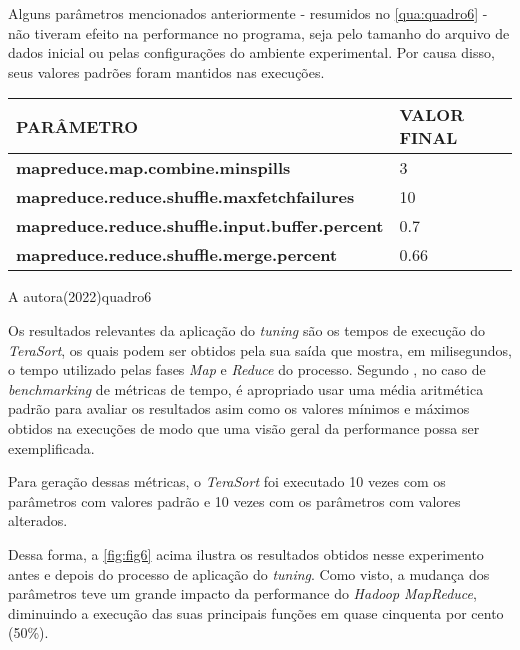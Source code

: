 Alguns parâmetros mencionados anteriormente - resumidos no \autoref{qua:quadro6} - não tiveram efeito na performance no programa, seja pelo tamanho do arquivo de dados inicial ou pelas configurações do ambiente experimental. Por causa disso, seus valores padrões foram mantidos nas execuções.

{\footnotesize
  \centering
  \begin{tabular}{|p{75mm}|p{25mm}|}\hline
    \textbf{PARÂMETRO}                                     & \textbf{VALOR FINAL} \\\hline
    \textbf{mapreduce.map.combine.minspills}               & 3                    \\\hline
    \textbf{mapreduce.reduce.shuffle.maxfetchfailures}     & 10                   \\\hline
    \textbf{mapreduce.reduce.shuffle.input.buffer.percent} & 0.7                  \\\hline
    \textbf{mapreduce.reduce.shuffle.merge.percent}        & 0.66                 \\\hline
  \end{tabular}}
{A autora(2022)}{quadro6}{}{}

Os resultados relevantes da aplicação do \textit{\gls{tuning}} são os tempos de execução do \textit{TeraSort}, os quais podem ser obtidos pela sua saída que mostra, em milisegundos, o tempo utilizado pelas fases \textit{Map} e \textit{Reduce} do processo. Segundo \textcite{Fleming86}, no caso de \textit{\gls{benchmark}ing} de métricas de tempo, é apropriado usar uma média aritmética padrão para avaliar os resultados asim como os valores mínimos e máximos obtidos na execuções de modo que uma visão geral da performance possa ser exemplificada.

Para geração dessas métricas, o \textit{TeraSort} foi executado 10 vezes com os parâmetros com valores padrão e 10 vezes com os parâmetros com valores alterados.


\newpage
Dessa forma, a \autoref{fig:fig6} acima ilustra os resultados obtidos nesse experimento antes e depois do processo de aplicação do \textit{\gls{tuning}}. Como visto, a mudança dos parâmetros teve um grande impacto da performance do \textit{Hadoop MapReduce}, diminuindo a execução das suas principais funções em quase cinquenta por cento (50\%). 
